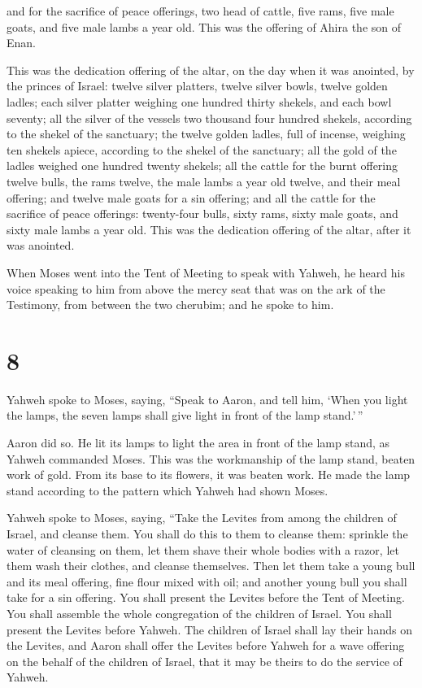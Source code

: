  and for the sacrifice of peace offerings, two head of
cattle, five rams, five male goats, and five male lambs a year old. This
was the offering of Ahira the son of Enan.

 This was the dedication offering of the altar, on the day
when it was anointed, by the princes of Israel: twelve silver platters,
twelve silver bowls, twelve golden ladles;  each silver
platter weighing one hundred thirty shekels, and each bowl seventy; all
the silver of the vessels two thousand four hundred shekels, according
to the shekel of the sanctuary;  the twelve golden ladles,
full of incense, weighing ten shekels apiece, according to the shekel of
the sanctuary; all the gold of the ladles weighed one hundred twenty
shekels;  all the cattle for the burnt offering twelve
bulls, the rams twelve, the male lambs a year old twelve, and their meal
offering; and twelve male goats for a sin offering;  and
all the cattle for the sacrifice of peace offerings: twenty-four bulls,
sixty rams, sixty male goats, and sixty male lambs a year old. This was
the dedication offering of the altar, after it was anointed.

 When Moses went into the Tent of Meeting to speak with
Yahweh, he heard his voice speaking to him from above the mercy seat
that was on the ark of the Testimony, from between the two cherubim; and
he spoke to him.

\hypertarget{section-7}{%
\section{8}\label{section-7}}

 Yahweh spoke to Moses, saying,  ``Speak to
Aaron, and tell him, `When you light the lamps, the seven lamps shall
give light in front of the lamp stand.'\,''

 Aaron did so. He lit its lamps to light the area in front
of the lamp stand, as Yahweh commanded Moses.  This was the
workmanship of the lamp stand, beaten work of gold. From its base to its
flowers, it was beaten work. He made the lamp stand according to the
pattern which Yahweh had shown Moses.

 Yahweh spoke to Moses, saying,  ``Take the
Levites from among the children of Israel, and cleanse them.
 You shall do this to them to cleanse them: sprinkle the
water of cleansing on them, let them shave their whole bodies with a
razor, let them wash their clothes, and cleanse themselves. 
Then let them take a young bull and its meal offering, fine flour mixed
with oil; and another young bull you shall take for a sin offering.
 You shall present the Levites before the Tent of Meeting.
You shall assemble the whole congregation of the children of Israel.
 You shall present the Levites before Yahweh. The children
of Israel shall lay their hands on the Levites,  and Aaron
shall offer the Levites before Yahweh for a wave offering on the behalf
of the children of Israel, that it may be theirs to do the service of
Yahweh.


